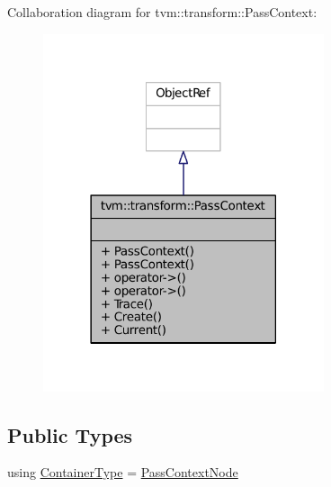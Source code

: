 Collaboration diagram for tvm\+:\+:transform\+:\+:Pass\+Context\+:
\nopagebreak
\begin{figure}[H]
\begin{center}
\leavevmode
\includegraphics[width=234pt]{classtvm_1_1transform_1_1PassContext__coll__graph}
\end{center}
\end{figure}
\subsection*{Public Types}
\begin{DoxyCompactItemize}
\item 
using \hyperlink{classtvm_1_1transform_1_1PassContext_aacc7ca51bec83db2784d871bb324ce93}{Container\+Type} = \hyperlink{classtvm_1_1transform_1_1PassContextNode}{Pass\+Context\+Node}
\end{DoxyCompactItemize}
